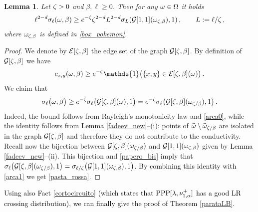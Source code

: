 \documentclass[12pt,a4paper,reqno]{amsart}
\newtheorem{Lemma}[Theorem]{Lemma}
\newcommand{\cE}{\ensuremath{\mathcal E}}
\newcommand{\cG}{\ensuremath{\mathcal G}}
\newcommand{\bbG}{{\ensuremath{\mathbb G}} }
\newcommand{\bbP}{{\ensuremath{\mathbb P}} }
\newcommand{\bbR}{{\ensuremath{\mathbb R}} }
\let\a=\alpha \let\b=\beta   \let\d=\delta  \let\e=\varepsilon
\let\O=\Omega \let\P=\Pi   \let\Ps=\Psi \let\Si=\Sigma \let\X=\Xi
\newcommand{\rosso}{\textcolor{black}} %
\newcommand{\orc}{\textcolor{black}} %
\newcommand{\club}{$\clubsuit$}
\newcommand{\be}{\begin{equation}}
\newcommand{\en}{\end{equation}}
\begin{document}


\begin{Lemma}\label{lasagne25}
Let $\zeta>0$ and $\b, \ell \geq 0$. Then  for any $\o\in \O$ it holds 
\be\label{pasta_rossa}
\ell^{2-d}\s_\ell(\o, \b)\geq  e^{-\z} \z^{2-d} L ^{2-d} \s_{L} ( \cG[1,1](\o_{\z,\b}  ),1)\,, \qquad  L:= \ell/\z\,,
\en
where $\o_{\z,\b}$ is defined in \eqref{box_pokemon}.
\end{Lemma}
\begin{proof}
We denote by $\cE[\z,\b]$ the edge set of the graph $\cG[\z,\b]$. By definition of $\cG[\z,\b]$ we have
\be \label{arca0}
c_{x,y}(\o, \b) \geq e^{-\z} \mathds{1} \bigl( \{x,y\} \in \cE[\z,\b](\o)\bigr)\,.
\en
We claim that 
\be \label{arca1}
\s_\ell\bigl(\o, \b\bigr) \geq e^{-\z} \s_\ell \bigl(\cG[\z,\b](\o) , 1\bigr)=   e^{-\z} \s_\ell \bigl(\cG[\z,\b](\o_{\z/\b} ) , 1\bigr) \,.
\en
Indeed, the  bound follows from Rayleigh's monotonicity law and \eqref{arca0}, while the identity follows from   \orc{Lemma} \ref{fadeev_new}--(i): points of $\widehat{\o}\setminus \widehat{\o}_{\z/\b}$ are isolated in the graph $\cG[\z,\b] $ and therefore they do not contribute to the conductivity. Recall now the  bijection between $\cG[\z,\b](\o_{\z/\b})$ and $\cG[1,1](\o_{\z,\b})$ given by \orc{Lemma} \ref{fadeev_new}--(ii). This bijection and \eqref{papero_bis} imply that 
$\s_\ell \bigl(\cG[\z,\b](\o_{\z/\b} ) , 1\bigr)= \s_{\ell/\z} \bigl(\cG[1,1](\o_{\z,\b} ) , 1\bigr)$. 
\orc{By combining  this identity with} \eqref{arca1}  we get \eqref{pasta_rossa}.
\end{proof}




\rosso{Using also  Fact \ref{cortocircuito} (which states that ${\rm PPP}[\l, \nu_{1,\a}^+]$ has a good LR crossing distribution), we can  finally give the proof of Theorem  \ref{parataLB}.}
\end{document}
